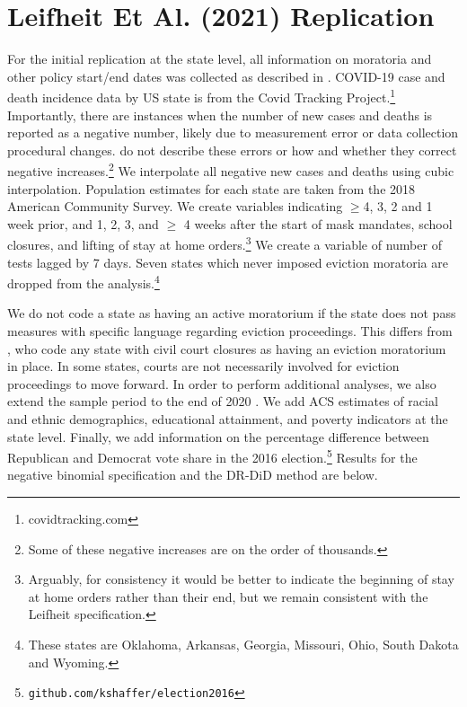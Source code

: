 \documentclass[12pt]{amsart}
\begin{document}
\clearpage

\appendix 
\setcounter{table}{0}
\setcounter{figure}{0}
\renewcommand{\thetable}{A\arabic{table}}
\renewcommand{\thefigure}{A\arabic{figure}}

\section{ Leifheit Et Al. (2021) Replication}

For the initial replication at the state level, all information on moratoria and other policy start/end dates was collected as described in . COVID-19 case and death incidence data by US state is from  the Covid Tracking Project.\footnote{covidtracking.com} Importantly, there are instances when the number of new cases and deaths is reported as a negative number, likely due to measurement error or data collection procedural changes.  do not describe these errors or how and whether they correct negative increases.\footnote{Some of these negative increases are on the order of thousands.} We interpolate all negative new cases and deaths using cubic interpolation. Population estimates for each state are taken from the 2018 American Community Survey. We create variables indicating $\geq$4, 3, 2 and 1 week prior, and 1, 2, 3, and $\geq$ 4 weeks after the start of mask mandates, school closures, and lifting of stay at home orders.\footnote{Arguably, for consistency it would be better to indicate the beginning of stay at home orders rather than their end, but we remain consistent with the Leifheit specification.} We create a variable of number of tests lagged by 7 days. Seven states which never imposed eviction moratoria are dropped from the analysis.\footnote{These states are Oklahoma, Arkansas, Georgia, Missouri, Ohio, South Dakota and Wyoming.} 

We do not code a state as having an active moratorium if the state does not pass measures with specific language regarding eviction proceedings. This differs from , who code any state with civil court closures as having an eviction moratorium in place. In some states, courts are not necessarily involved for eviction proceedings to move forward. In order to perform additional analyses, we also extend the sample period to the end of 2020 . We add ACS estimates of racial and ethnic demographics, educational attainment, and poverty indicators at the state level. Finally, we add information on the percentage difference between Republican and Democrat vote share in the 2016 election.\footnote{ \tt github.com/kshaffer/election2016} Results for the negative binomial specification and the DR-DiD method are below.
\end{document}
